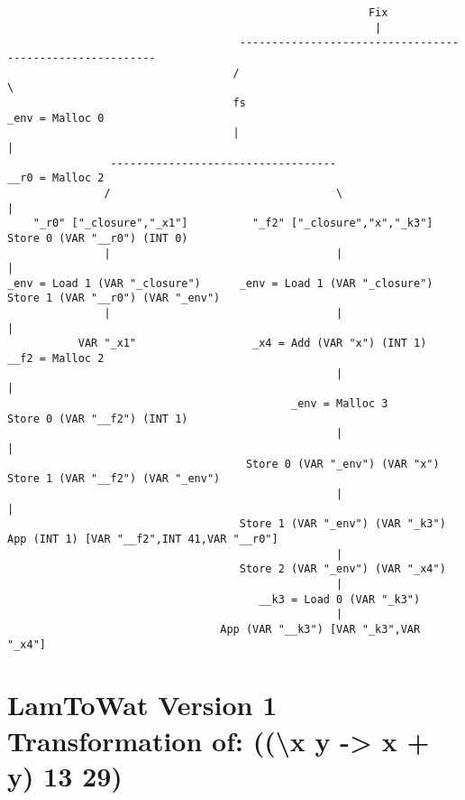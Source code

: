 \begin{landscape}
\begin{lstlisting}
                                                        Fix
                                                         |
                                    ---------------------------------------------------------
                                   /                                                         \
                                   fs                                                 _env = Malloc 0
                                   |                                                         |
                -----------------------------------                                   __r0 = Malloc 2
               /                                   \                                         |
    "_r0" ["_closure","_x1"]          "_f2" ["_closure","x","_k3"]              Store 0 (VAR "__r0") (INT 0)
               |                                   |                                         |
_env = Load 1 (VAR "_closure")      _env = Load 1 (VAR "_closure")           Store 1 (VAR "__r0") (VAR "_env")
               |                                   |                                         |
           VAR "_x1"                  _x4 = Add (VAR "x") (INT 1)                     __f2 = Malloc 2
                                                   |                                         |
                                            _env = Malloc 3                     Store 0 (VAR "__f2") (INT 1)
                                                   |                                         |
                                     Store 0 (VAR "_env") (VAR "x")          Store 1 (VAR "__f2") (VAR "_env")
                                                   |                                         |
                                    Store 1 (VAR "_env") (VAR "_k3")     App (INT 1) [VAR "__f2",INT 41,VAR "__r0"]
                                                   |
                                    Store 2 (VAR "_env") (VAR "_x4")
                                                   |
                                       __k3 = Load 0 (VAR "_k3")
                                                   |
                                 App (VAR "__k3") [VAR "_k3",VAR "_x4"]

\end{lstlisting}
\end{landscape}
\clearpage

\section{\label{section:v1printnest}LamToWat Version 1 Transformation of: ((\textbackslash x y -> x + y) 13 29)}

